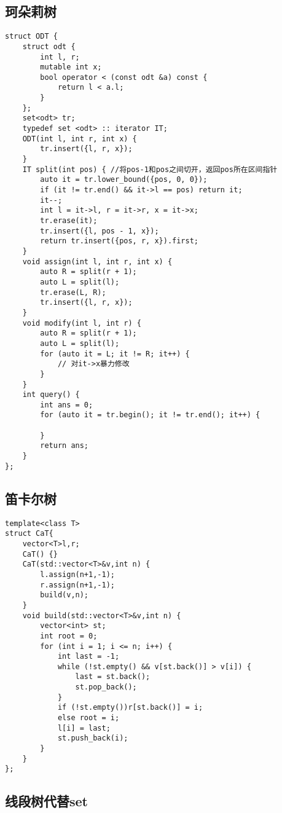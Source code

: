 \documentclass[a4paper,10pt]{article}
\begin{document}
\subsection{珂朵莉树}
\thispagestyle{fancy}

\noindent\begin{lstlisting}
struct ODT {
    struct odt {
        int l, r;
        mutable int x;
        bool operator < (const odt &a) const {
            return l < a.l;
        }
    };
    set<odt> tr;
    typedef set <odt> :: iterator IT;
    ODT(int l, int r, int x) {
        tr.insert({l, r, x});
    }
    IT split(int pos) { //将pos-1和pos之间切开，返回pos所在区间指针
        auto it = tr.lower_bound({pos, 0, 0});
        if (it != tr.end() && it->l == pos) return it;
        it--;
        int l = it->l, r = it->r, x = it->x;
        tr.erase(it);
        tr.insert({l, pos - 1, x});
        return tr.insert({pos, r, x}).first;
    }
    void assign(int l, int r, int x) {
        auto R = split(r + 1);
        auto L = split(l);
        tr.erase(L, R);
        tr.insert({l, r, x});
    }
    void modify(int l, int r) {
        auto R = split(r + 1);
        auto L = split(l);
        for (auto it = L; it != R; it++) {
            // 对it->x暴力修改
        }
    }
    int query() {
        int ans = 0;
        for (auto it = tr.begin(); it != tr.end(); it++) {

        }
        return ans;
    }
};\end{lstlisting}

\subsection{笛卡尔树}
\thispagestyle{fancy}

\noindent\begin{lstlisting}
template<class T>
struct CaT{
    vector<T>l,r;
    CaT() {}
    CaT(std::vector<T>&v,int n) {
        l.assign(n+1,-1);
        r.assign(n+1,-1);
        build(v,n);
    }
    void build(std::vector<T>&v,int n) {
        vector<int> st;
        int root = 0;
        for (int i = 1; i <= n; i++) {
            int last = -1;
            while (!st.empty() && v[st.back()] > v[i]) {
                last = st.back();
                st.pop_back();
            }
            if (!st.empty())r[st.back()] = i;
            else root = i;
            l[i] = last;
            st.push_back(i);
        }
    }
};\end{lstlisting}

\subsection{线段树代替set}
\thispagestyle{fancy}
\end{document}
